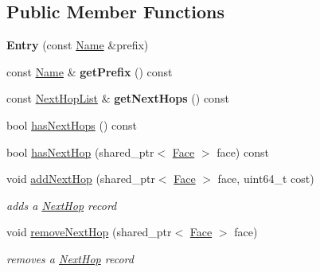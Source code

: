 \subsection*{Public Member Functions}
\begin{DoxyCompactItemize}
\item 
{\bfseries Entry} (const \hyperlink{classndn_1_1Name}{Name} \&prefix)\hypertarget{classnfd_1_1fib_1_1Entry_aba0878ececf2c8c34c8c6edc7a1a872d}{}\label{classnfd_1_1fib_1_1Entry_aba0878ececf2c8c34c8c6edc7a1a872d}

\item 
const \hyperlink{classndn_1_1Name}{Name} \& {\bfseries get\+Prefix} () const\hypertarget{classnfd_1_1fib_1_1Entry_a4a2cb146ce202ec872159632c6914db9}{}\label{classnfd_1_1fib_1_1Entry_a4a2cb146ce202ec872159632c6914db9}

\item 
const \hyperlink{classNextHopList}{Next\+Hop\+List} \& {\bfseries get\+Next\+Hops} () const\hypertarget{classnfd_1_1fib_1_1Entry_ac094af2d61fcad2bb5b1f83d451ed746}{}\label{classnfd_1_1fib_1_1Entry_ac094af2d61fcad2bb5b1f83d451ed746}

\item 
bool \hyperlink{classnfd_1_1fib_1_1Entry_a8681519d746bc3514ec28f5a00e344db}{has\+Next\+Hops} () const
\item 
bool \hyperlink{classnfd_1_1fib_1_1Entry_ac1173a808d3c921cb8df7479e6700315}{has\+Next\+Hop} (shared\+\_\+ptr$<$ \hyperlink{classnfd_1_1Face}{Face} $>$ face) const
\item 
void \hyperlink{classnfd_1_1fib_1_1Entry_ade33e38be7399331455b7fd902e2c657}{add\+Next\+Hop} (shared\+\_\+ptr$<$ \hyperlink{classnfd_1_1Face}{Face} $>$ face, uint64\+\_\+t cost)
\begin{DoxyCompactList}\small\item\em adds a \hyperlink{classnfd_1_1fib_1_1NextHop}{Next\+Hop} record \end{DoxyCompactList}\item 
void \hyperlink{classnfd_1_1fib_1_1Entry_a1f3a9e13663b2e40f89c0501426795d2}{remove\+Next\+Hop} (shared\+\_\+ptr$<$ \hyperlink{classnfd_1_1Face}{Face} $>$ face)
\begin{DoxyCompactList}\small\item\em removes a \hyperlink{classnfd_1_1fib_1_1NextHop}{Next\+Hop} record \end{DoxyCompactList}\end{DoxyCompactItemize}
